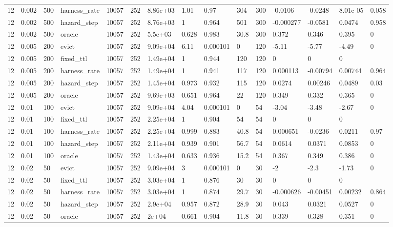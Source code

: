 \begin{tabular}{lllllllllllllll}
12 & 0.002 & 500 & harness\_rate & 10057 & 252 & 8.86e+03 & 1.01 & 0.97 & 304 & 300 & -0.0106 & -0.0248 & 8.01e-05 & 0.058 \\
12 & 0.002 & 500 & hazard\_step & 10057 & 252 & 8.76e+03 & 1 & 0.964 & 501 & 300 & -0.000277 & -0.0581 & 0.0474 & 0.958 \\
12 & 0.002 & 500 & oracle & 10057 & 252 & 5.5e+03 & 0.628 & 0.983 & 30.8 & 300 & 0.372 & 0.346 & 0.395 & 0 \\
12 & 0.005 & 200 & evict & 10057 & 252 & 9.09e+04 & 6.11 & 0.000101 & 0 & 120 & -5.11 & -5.77 & -4.49 & 0 \\
12 & 0.005 & 200 & fixed\_ttl & 10057 & 252 & 1.49e+04 & 1 & 0.944 & 120 & 120 & 0 & 0 & 0 &  \\
12 & 0.005 & 200 & harness\_rate & 10057 & 252 & 1.49e+04 & 1 & 0.941 & 117 & 120 & 0.000113 & -0.00794 & 0.00744 & 0.964 \\
12 & 0.005 & 200 & hazard\_step & 10057 & 252 & 1.45e+04 & 0.973 & 0.932 & 115 & 120 & 0.0274 & 0.00246 & 0.0489 & 0.03 \\
12 & 0.005 & 200 & oracle & 10057 & 252 & 9.69e+03 & 0.651 & 0.964 & 22 & 120 & 0.349 & 0.332 & 0.365 & 0 \\
12 & 0.01 & 100 & evict & 10057 & 252 & 9.09e+04 & 4.04 & 0.000101 & 0 & 54 & -3.04 & -3.48 & -2.67 & 0 \\
12 & 0.01 & 100 & fixed\_ttl & 10057 & 252 & 2.25e+04 & 1 & 0.904 & 54 & 54 & 0 & 0 & 0 &  \\
12 & 0.01 & 100 & harness\_rate & 10057 & 252 & 2.25e+04 & 0.999 & 0.883 & 40.8 & 54 & 0.000651 & -0.0236 & 0.0211 & 0.97 \\
12 & 0.01 & 100 & hazard\_step & 10057 & 252 & 2.11e+04 & 0.939 & 0.901 & 56.7 & 54 & 0.0614 & 0.0371 & 0.0853 & 0 \\
12 & 0.01 & 100 & oracle & 10057 & 252 & 1.43e+04 & 0.633 & 0.936 & 15.2 & 54 & 0.367 & 0.349 & 0.386 & 0 \\
12 & 0.02 & 50 & evict & 10057 & 252 & 9.09e+04 & 3 & 0.000101 & 0 & 30 & -2 & -2.3 & -1.73 & 0 \\
12 & 0.02 & 50 & fixed\_ttl & 10057 & 252 & 3.03e+04 & 1 & 0.876 & 30 & 30 & 0 & 0 & 0 &  \\
12 & 0.02 & 50 & harness\_rate & 10057 & 252 & 3.03e+04 & 1 & 0.874 & 29.7 & 30 & -0.000626 & -0.00451 & 0.00232 & 0.864 \\
12 & 0.02 & 50 & hazard\_step & 10057 & 252 & 2.9e+04 & 0.957 & 0.872 & 28.9 & 30 & 0.043 & 0.0321 & 0.0527 & 0 \\
12 & 0.02 & 50 & oracle & 10057 & 252 & 2e+04 & 0.661 & 0.904 & 11.8 & 30 & 0.339 & 0.328 & 0.351 & 0 \\

\end{tabular}
